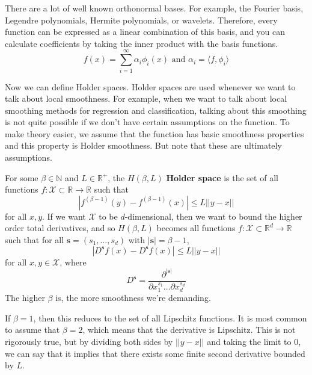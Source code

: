 \documentclass{article}
\begin{document}
    There are a lot of well known orthonormal bases. For example, the Fourier basis, Legendre polynomials, Hermite polynomials, or wavelets. Therefore, every function can be expressed as a linear combination of this basis, and you can calculate coefficients by taking the inner product with the basis functions. 
    \begin{equation}
      f(x) = \sum_{i=1}^\infty \alpha_i \phi_i (x) \text{ and } \alpha_i = \langle f, \phi_i \rangle
    \end{equation}

    Now we can define Holder spaces. Holder spaces are used whenever we want to talk about local smoothness. For example, when we want to talk about local smoothing methods for regression and classification, talking about this smoothing is not quite possible if we don't have certain assumptions on the function. To make theory easier, we assume that the function has basic smoothness properties and this property is Holder smoothness. But note that these are ultimately assumptions. 


    \begin{definition}
      For some $\beta \in \mathbb{N}$ and $L \in \mathbb{R}^+$, the $H(\beta, L)$ \textbf{Holder space} is the set of all functions $f: \mathcal{X} \subset \mathbb{R} \rightarrow \mathbb{R}$ such that 
      \begin{equation}
        |f^{(\beta - 1)}(y) - f^{(\beta - 1)}(x)| \leq L ||y - x||
      \end{equation}
      for all $x, y$. If we want $\mathcal{X}$ to be $d$-dimensional, then we want to bound the higher order total derivatives, and so $H(\beta, L)$ becomes all functions $f: \mathcal{X} \subset \mathbb{R}^d \rightarrow \mathbb{R}$ such that for all $\mathbf{s} = (s_1, \ldots, s_d)$ with $|\mathbf{s}| = \beta - 1$,
      \begin{equation}
        |D^{\mathbf{s}} f(x) - D^{\mathbf{s}} f(x)| \leq L ||y - x||
      \end{equation}
      for all $x, y \in \mathcal{X}$, where 
      \begin{equation}
        D^{\mathbf{s}} = \frac{\partial^{|\mathbf{s}|}}{\partial x_1^{s_1} \ldots \partial x_d^{s_d}} 
      \end{equation}
      The higher $\beta$ is, the more smoothness we're demanding. 
    \end{definition}

    If $\beta = 1$, then this reduces to the set of all Lipschitz functions. It is most common to assume that $\beta = 2$, which means that the derivative is Lipschitz. This is not rigorously true, but by dividing both sides by $||y - x||$ and taking the limit to $0$, we can say that it implies that there exists some finite second derivative bounded by $L$. 
\end{document}
